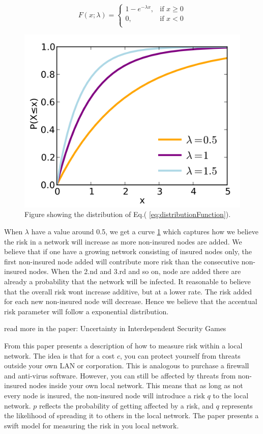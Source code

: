 \begin{equation}
    F(x;\lambda)= 
\begin{cases}
    1-e^{-\lambda x} ,& \text{if } x \geq 0\\
   0,& \text{if }  x<0\\
    
    
\end{cases}
\label{eq:distributionFunction}
\end{equation}



\begin{figure}[h]
\centering
  \includegraphics[width=0.5\linewidth]{../Figures/exponentialFunction.png}
  \caption{\label{fig:exponentialFunction} Figure showing the distribution of Eq.( \ref{eq:distributionFunction}). }
\end{figure}

When $\lambda$ have a value around 0.5, we get a curve \ref{fig:exponentialFunction} which captures how we believe the risk in a network will increase as more non-insured nodes are added. We believe that if one have a growing network consisting of insured nodes only, the first non-insured node added will contribute more risk than the consecutive non-insured nodes. When the 2.nd and 3.rd and so on, node are added there are already a probability that the network will be infected. It reasonable to believe that the overall risk wont increase additive, but at a lower rate. The risk added for each new non-insured node will decrease. Hence we believe that the accentual risk parameter will follow a exponential distribution. 

read more in the paper: Uncertainty in Interdependent Security Games

From this paper presents a description of how to measure risk within a local network. The idea is that for a cost $c$, you can protect yourself from threats outside your own LAN or corporation. This is analogous to purchase a firewall and anti-virus software. However, you can still be affected by threats from non-insured nodes inside your own local network. This means that as long as not every node is insured, the non-insured node will introduce a risk $q$ to the local network. $p$ reflects the probability of getting affected by a risk, and $q$ represents the likelihood of spreading it to others in the local network. The paper presents a swift model for measuring the risk in you local network.

